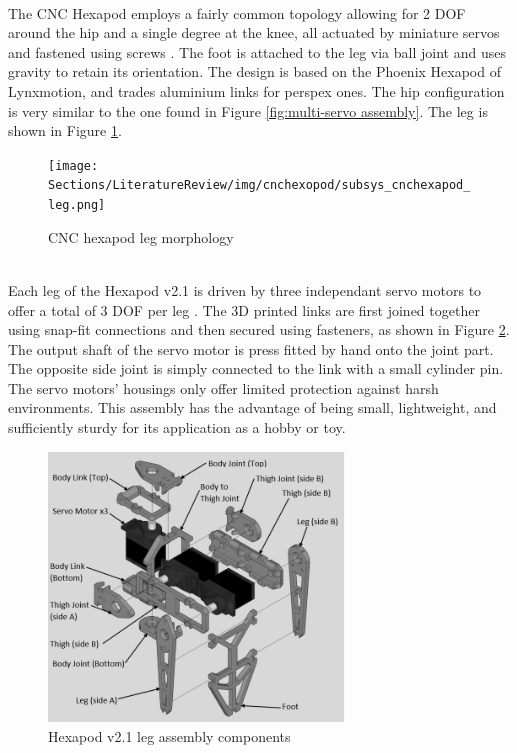  \mbox{}\\

The CNC Hexapod employs a fairly common topology allowing for 2 DOF around the hip and a single degree at the knee, all actuated by miniature servos and fastened using screws \cite{murshiduzzaman_hexapod_2019}.
The foot is attached to the leg via ball joint and uses gravity to retain its orientation.
The design is based on the Phoenix Hexapod of Lynxmotion, and trades aluminium links for perspex ones.
The hip configuration is very similar to the one found in Figure \ref{fig:multi-servo assembly}.
The leg is shown in Figure \ref{fig:cnchexapod_leg}.

\begin{figure}[h]
    \centering
    \texttt{[image: Sections/LiteratureReview/img/cnchexopod/subsys\_cnchexapod\_leg.png]}
    \caption{CNC hexapod leg morphology \cite{murshiduzzaman_hexapod_2019}}
    \label{fig:cnchexapod_leg}
\end{figure}

 \mbox{}\\

Each leg of the Hexapod v2.1 is driven by three independant servo motors to offer a total of 3 DOF per leg \cite{smallp_tsai_hexapod_2018}. The 3D printed links are first joined together using snap-fit connections and then secured using fasteners, as shown in Figure \ref{fig:hexapod_legass_img}. The output shaft of the servo motor is press fitted by hand onto the joint part. The opposite side joint is simply connected to the link with a small cylinder pin. The servo motors' housings only offer limited protection against harsh environments. This assembly has the advantage of being small, lightweight, and sufficiently sturdy for its application as a hobby or toy.

\begin{figure}[H]
    \centering
    \includegraphics[width=0.7\textwidth]{Sections/LiteratureReview/img/hexapodV2.1/hexapod_v2p1_legass_ann.jpg}
    \caption{Hexapod v2.1 leg assembly components \cite{smallp_tsai_hexapod_2018}}
    \label{fig:hexapod_legass_img}
\end{figure}


